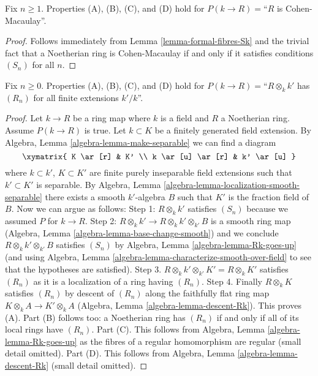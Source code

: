 \begin{lemma}
\label{lemma-formal-fibres-CM}
Fix $n \geq 1$. Properties (A), (B), (C), and (D) hold for
$P(k \to R) =$``$R$ is Cohen-Macaulay''.
\end{lemma}

\begin{proof}
Follows immediately from Lemma \ref{lemma-formal-fibres-Sk}
and the trivial fact that a Noetherian ring is Cohen-Macaulay if
and only if it satisfies conditions $(S_n)$ for all $n$.
\end{proof}

\begin{lemma}
\label{lemma-formal-fibres-Rk}
Fix $n \geq 0$. Properties (A), (B), (C), and (D) hold for
$P(k \to R) =$``$R \otimes_k k'$ has $(R_n)$ for all finite
extensions $k'/k$''.
\end{lemma}

\begin{proof}
Let $k \to R$ be a ring map where $k$ is a field and $R$ a Noetherian
ring. Assume $P(k \to R)$ is true.
Let $k \subset K$ be a finitely generated field extension.
By Algebra, Lemma \ref{algebra-lemma-make-separable} we can find a diagram
$$
\xymatrix{
K \ar[r] & K' \\
k \ar[u] \ar[r] & k' \ar[u]
}
$$
where $k \subset k'$, $K \subset K'$ are finite purely inseparable field
extensions such that $k' \subset K'$ is separable. By
Algebra, Lemma \ref{algebra-lemma-localization-smooth-separable}
there exists a smooth $k'$-algebra $B$ such that $K'$ is the
fraction field of $B$. Now we can argue as follows:
Step 1: $R \otimes_k k'$ satisfies $(S_n)$ because we assumed $P$
for $k \to R$.
Step 2: $R \otimes_k k' \to R \otimes_k k' \otimes_{k'} B$ is a
smooth ring map (Algebra, Lemma \ref{algebra-lemma-base-change-smooth})
and we conclude $R \otimes_k k' \otimes_{k'} B$ satisfies $(S_n)$
by Algebra, Lemma \ref{algebra-lemma-Rk-goes-up}
(and using Algebra, Lemma \ref{algebra-lemma-characterize-smooth-over-field}
to see that the hypotheses are satisfied).
Step 3. $R \otimes_k k' \otimes_{k'} K' = R \otimes_k K'$ satisfies
$(R_n)$ as it is a localization of a ring having $(R_n)$.
Step 4. Finally $R \otimes_k K$ satisfies $(R_n)$ by descent of
$(R_n)$ along the faithfully flat ring map
$K \otimes_k A \to K' \otimes_k A$
(Algebra, Lemma \ref{algebra-lemma-descent-Rk}).
This proves (A).
Part (B) follows too: a Noetherian ring has $(R_n)$ if and only if
all of its local rings have $(R_n)$.
Part (C). This follows from Algebra, Lemma \ref{algebra-lemma-Rk-goes-up}
as the fibres of a regular homomorphism are regular (small detail omitted).
Part (D). This follows from Algebra, Lemma \ref{algebra-lemma-descent-Rk}
(small detail omitted).
\end{proof}









